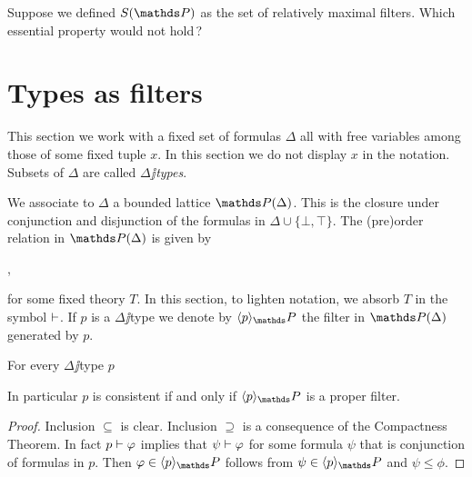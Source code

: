 \documentclass[creche.tex]{subfiles}
\begin{document}
\begin{exercise}
Suppose we defined $S(\PP)$ as the set of relatively maximal filters. Which essential property would not hold\,?\QED
\end{exercise}
\section{Types as filters}\label{frammenti}

This section we work with a fixed set of formulas \emph{$\Delta$\/} all with free variables among those of some fixed tuple \emph{$x$}. In this section we do not display $x$ in the notation. Subsets of $\Delta$ are called \emph{$\Delta\jj$types}.

We associate to $\Delta$ a bounded lattice \emph{$\PP(\Delta)$}. This is the closure under conjunction and disjunction of the formulas in $\Delta\cup\{\bot,\top\}$. The (pre)order relation in $\PP(\Delta)$ is given by

,

for some fixed theory $T$. In this section, to lighten notation, we absorb $T$ in the symbol $\vdash$. If $p$ is a $\Delta\jj$type we denote by $\<p\>_\PP$ the filter in $\PP(\Delta)$ generated by $p$.




\begin{lemma}\label{lem_poiuyhdsdfd}
For every $\Delta\jj$type $p$


In particular $p$ is consistent if and only if $\<p\>_\PP$ is a proper filter.
\end{lemma}



\begin{proof}
Inclusion $\subseteq$ is clear. Inclusion $\supseteq$ is a consequence of the Compactness Theorem. In fact $p\vdash\varphi$ implies that $\psi\vdash\varphi$ for some formula $\psi$ that is conjunction of formulas in $p$. Then $\phi\in\<p\>_\PP$ follows from $\psi\in\<p\>_\PP$ and $\psi\le\phi$.
\end{proof}
\end{document}

